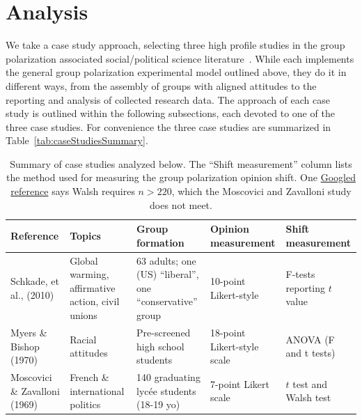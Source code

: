 \documentclass[11pt,letterpaper]{article}
\begin{document}
\section{Analysis}

We take a case study approach, selecting three high profile studies in the
group polarization associated social/political science 
literature~\cite{Sunstein2009,Sunstein2019}. While each implements the general
group polarization experimental model outlined above, they do it in different
ways, from the assembly of groups with aligned attitudes to the reporting and
analysis of collected research data. The approach of each case study is
outlined within the following subsections, each devoted to one of the three
case studies. For convenience the three case studies are summarized in
Table~\ref{tab:caseStudiesSummary}.

\vspace{2em}
\begin{table}[h]
  \centering
  \begin{tabular}{p{1in}p{1.25in}p{1.15in}p{1.5in}p{1.25in}}
    \rowcolor{gray!50}
    Reference  &  Topics   &  Group formation  & Opinion measurement  & Shift measurement  \\ \toprule
    Schkade, et al., (2010) & Global warming, affirmative action, civil unions
                            & 63 adults; one (US) ``liberal'', one 
                              ``conservative'' group
                            & 10-point Likert-style  
                            & F-tests reporting $t$ value \\
    Myers \& Bishop (1970) & Racial attitudes &  Pre-screened 
                                                 high school students 
                           & 18-point Likert-style scale  
                           & ANOVA (F and t tests)  \\
    Moscovici \& Zavalloni (1969) & French \& international politics
                                  & 140 graduating lyc\'{e}e students (18-19 yo)
                                  & 7-point Likert scale
                                  & $t$ test and Walsh test
                            
  \end{tabular}
  \caption{Summary of case studies analyzed below. The ``Shift measurement'' column lists the method used for measuring the group polarization opinion shift. One \href{http://www.statistics4u.com/fundstat_eng/ee_walsh_outliertest.html}{Googled reference} says Walsh requires $n > 220$, which the Moscovici and Zavalloni study does not meet.}
\end{table}
\end{document}
